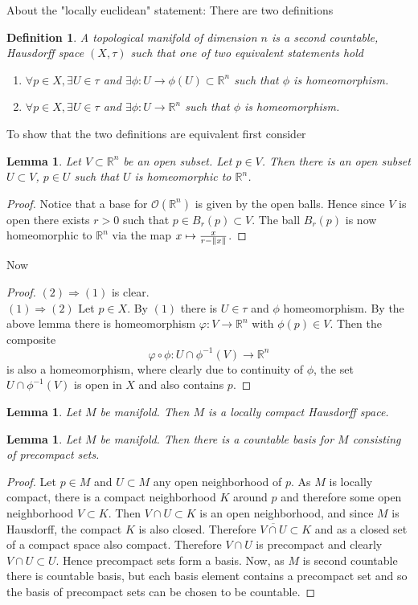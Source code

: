 \documentclass{article}
\numberwithin{theorem}{section}
\newtheorem{lemma}[theorem]{Lemma}
\newtheorem{definition}[theorem]{Definition}
\newcommand{\R}{\mathbb{R}}
\newcommand{\1}{\mathds{1}}
\begin{document}
About the "locally euclidean" statement:
There are two definitions 
\begin{definition}\label{locally_euclidean}
    A topological manifold of dimension $n$ is a second countable, Hausdorff space $(X,\tau)$ such that one of two equivalent statements hold 
    \begin{enumerate}
        \item $\forall p \in X, \exists U \in \tau$ and $\exists \phi: U \to \phi(U) \subset \R^n $ such that $\phi$ is homeomorphism. 
        \item $\forall p \in X, \exists U \in \tau$ and $\exists \phi: U \to \R^n$ such that $\phi$ is homeomorphism. 
    \end{enumerate}
\end{definition}
To show that the two definitions are equivalent first consider 
\begin{lemma}
    Let $V\subset \R^n$ be an open subset. Let $p \in V$. Then there is an open subset $U\subset V$, $p\in U$ such that $U$ is homeomorphic to $\R^n$. 
\end{lemma}
\begin{proof}
    Notice that a base for $\mathcal{O}(\R^n)$ is given by the open balls. Hence since $V$ is open there exists $r>0$ such that $p\in B_r(p) \subset V$. The ball $B_r(p)$ is now homeomorphic to $\R^n$ via the map $x \mapsto \frac{x}{r- \norm{x}}$.  
\end{proof}
Now 
\begin{proof}
    $(2) \Rightarrow (1)$ is clear. \\
    $(1) \Rightarrow (2)$ Let $p \in X$. By $(1)$ there is $U\in \tau$ and $\phi$ homeomorphism. By the above lemma there is homeomorphism $\varphi: V \to \R^n$ with $\phi(p) \in V$. Then the composite 
    \[ \varphi \circ \phi : U \cap \phi^{-1}(V) \to \R^n \]
    is also a homeomorphism, where clearly due to continuity of $\phi$, the set $U\cap \phi^{-1}(V)$ is open in $X$ and also contains $p$. 
\end{proof}

\begin{lemma}
Let $M$ be manifold. Then $M$ is a locally compact Hausdorff space. 
\end{lemma}

\begin{lemma}
    Let $M$ be manifold. Then there is a countable basis for $M$ consisting of precompact sets. 
\end{lemma}
\begin{proof}
    Let $p\in M$ and $U\subset M$ any open neighborhood of $p$. As $M$ is locally compact, there is a compact neighborhood $K$ around $p$ and therefore some open neighborhood $V\subset K$. Then $V\cap U \subset K $ is an open neighborhood, and since $M$ is Hausdorff, the compact $K$ is also closed. Therefore $\overline{V \cap U} \subset K$ and as a closed set of a compact space also compact. Therefore $V\cap U$ is precompact and clearly $V\cap U \subset U$. Hence precompact sets form a basis. Now, as $M$ is second countable there is countable basis, but each basis element contains a precompact set and so the basis of precompact sets can be chosen to be countable.
\end{proof}
\end{document}
